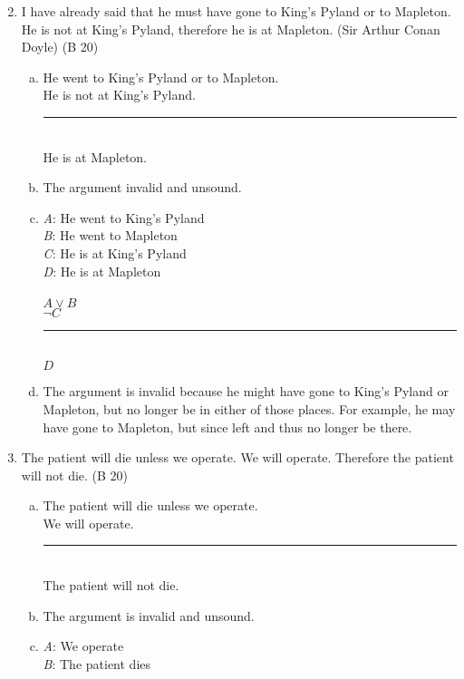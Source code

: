 \documentclass{article}
\begin{document}
\begin{enumerate}
      \setcounter{enumi}{1}
      \item I have already said that he must have gone to King's Pyland or to Mapleton. He is not at King's Pyland, therefore he is at Mapleton. (Sir Arthur Conan Doyle) (B 20)
            \begin{enumerate}[(a)]
                  \item He went to King's Pyland or to Mapleton.\\
                        He is not at King's Pyland.\\
                        \rule{15em}{.5pt}\\
                        He is at Mapleton.
                  \item The argument invalid and unsound.
                  \item \textit{A}: He went to King's Pyland\\
                        \textit{B}: He went to Mapleton\\
                        \textit{C}: He is at King's Pyland\\
                        \textit{D}: He is at Mapleton\\\\
                        $A \lor B$\\
                        $\neg C$\\
                        \rule{5em}{.5pt}\\
                        $D$
                        \setcounter{enumii}{4}
                  \item The argument is invalid because he might have gone to King's Pyland or Mapleton, but no longer be in either of those places. For example, he may have gone to Mapleton, but since left and thus no longer be there.
            \end{enumerate}
      \item The patient will die unless we operate. We will operate. Therefore the patient will not die. (B 20)
            \begin{enumerate}[(a)]
                  \item The patient will die unless we operate.\\
                        We will operate.\\
                        \rule{15em}{.5pt}\\
                        The patient will not die.
                  \item The argument is invalid and unsound.
                  \item \textit{A}: We operate\\
                        \textit{B}: The patient dies\\


\end{enumerate}
\end{enumerate}
\end{document}
